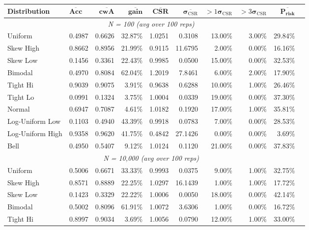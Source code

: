 \documentclass{article}
\theoremstyle{plain}
\theoremstyle{definition}
\theoremstyle{remark}
\begin{document}
\begin{table}[ht]
\centering
\footnotesize
\begin{tabular}{llrrrrrrrr}
\toprule
\textbf{Distribution} & $\overline{\textbf{Acc}}$ & $\overline{\textbf{cwA}}$ & $\overline{\textbf{gain}}$ & $\overline{\textbf{CSR}}$ & $\overline{\boldsymbol{\sigma}_{\mathrm{CSR}}}$ & $>1\boldsymbol{\sigma}_{\mathrm{CSR}}$ &  $>3\boldsymbol{\sigma}_{\mathrm{CSR}}$ & $\overline{\textbf{P}_{\textbf{risk}}}$ \\
\midrule
\multicolumn{9}{c}{\textit{N = 100  (avg over 100 reps)}} \\
\midrule
Uniform  & 0.4987 & 0.6626 & 32.87\% & 1.0251 & 0.3108 & 13.00\% & 3.00\% & 29.84\% \\
Skew High  & 0.8662 & 0.8956 & 21.99\% & 0.9115 & 11.6795 & 2.00\% & 0.00\% & 16.16\% \\
Skew Low  & 0.1456 & 0.3361 & 22.43\% & 0.9985 & 0.0500 & 15.00\% & 0.00\% & 32.53\% \\
Bimodal  & 0.4970 & 0.8084 & 62.04\% & 1.2019 & 7.8461 & 6.00\% & 2.00\% & 17.90\% \\
Tight Hi  & 0.9039 & 0.9075 & 3.91\% & 0.9638 & 0.6288 & 10.00\% & 1.00\% & 26.46\% \\
Tight Lo  & 0.0991 & 0.1324 & 3.75\% & 1.0004 & 0.0339 & 19.00\% & 0.00\% & 37.30\% \\
Normal  & 0.6947 & 0.7087 & 4.61\% & 1.0182 & 0.1920 & 17.00\% & 1.00\% & 35.81\% \\
Log-Uniform Low  & 0.1103 & 0.4940 & 43.39\% & 0.9918 & 0.0783 & 7.00\% & 0.00\% & 28.53\% \\
Log-Uniform High  & 0.9358 & 0.9620 & 41.75\% & 0.4842 & 27.1426 & 0.00\% & 0.00\% & 3.69\% \\
Bell  & 0.4950 & 0.5407 & 9.12\% & 1.0124 & 0.1120 & 21.00\% & 0.00\% & 37.83\% \\
\midrule
\multicolumn{9}{c}{\textit{N = 10,000  (avg over 100 reps)}} \\
\midrule
Uniform  & 0.5006 & 0.6671 & 33.33\% & 0.9993 & 0.0375 & 9.00\% & 1.00\% & 32.75\% \\
Skew High  & 0.8571 & 0.8889 & 22.25\% & 1.0297 & 16.1439 & 1.00\% & 1.00\% & 17.72\% \\
Skew Low  & 0.1423 & 0.3329 & 22.22\% & 1.0006 & 0.0050 & 18.00\% & 0.00\% & 42.14\% \\
Bimodal  & 0.5002 & 0.8096 & 61.91\% & 1.0072 & 3.6306 & 1.00\% & 0.00\% & 16.72\% \\
Tight Hi  & 0.8997 & 0.9034 & 3.69\% & 1.0056 & 0.0790 & 12.00\% & 1.00\% & 33.00\% \\

\end{tabular}
\end{table}
\end{document}
